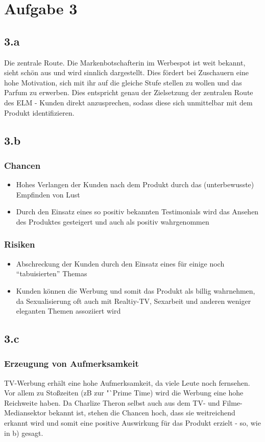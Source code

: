 \documentclass{article}
\begin{document}
\section{Aufgabe 3}
\subsection{3.a} 
Die zentrale Route. Die Markenbotschafterin im Werbespot ist weit bekannt, sieht schön aus und wird sinnlich dargestellt.
Dies fördert bei Zuschauern eine hohe Motivation, sich mit ihr auf die gleiche Stufe stellen zu wollen und das Parfum zu erwerben. Dies entspricht genau der Zielsetzung der zentralen Route des ELM - Kunden direkt anzusprechen, sodass diese sich unmittelbar mit dem Produkt identifizieren.

\subsection{3.b}
\subsubsection{Chancen}
\begin{itemize}
	\item Hohes Verlangen der Kunden nach dem Produkt durch das (unterbewusste) Empfinden von Lust 
	\item Durch den Einsatz eines so positiv bekannten Testimonials wird das Ansehen des Produktes gesteigert und auch als positiv wahrgenommen
\end{itemize}

\subsubsection{Risiken}
\begin{itemize}
	\item Abschreckung der Kunden durch den Einsatz eines für einige noch "`tabuisierten"' Themas
	\item Kunden können die Werbung und somit das Produkt als billig wahrnehmen, da Sexualisierung oft auch mit Realtiy-TV, Sexarbeit und anderen weniger eleganten Themen assoziiert wird
\end{itemize}


\subsection{3.c}
\subsubsection{Erzeugung von Aufmerksamkeit}
TV-Werbung erhält eine hohe Aufmerksamkeit, da viele Leute noch fernsehen. Vor allem zu Stoßzeiten (zB zur "`Prime Time) wird die Werbung eine hohe Reichweite haben. Da Charlize Theron selbst auch aus dem TV- und Filme-Mediansektor bekannt ist, stehen die Chancen hoch, dass sie weitreichend erkannt wird und somit eine positive Auswirkung für das Produkt erzielt - so, wie in b) gesagt.
\end{document}

